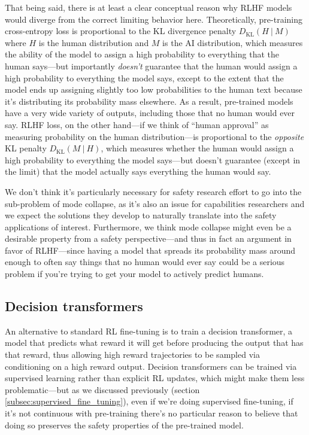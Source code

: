 \documentclass[
  twocolumn,
  natbib,
]{miri-tech-article}
\begin{document}
That being said, there is at least a clear conceptual reason why RLHF models would diverge from the correct limiting behavior here. Theoretically, pre-training cross-entropy loss is proportional to the KL divergence penalty $D_\text{KL}(H ~|~ M)$ where $H$ is the human distribution and $M$ is the AI distribution, which measures the ability of the model to assign a high probability to everything that the human says---but importantly \textit{doesn't} guarantee that the human would assign a high probability to everything the model says, except to the extent that the model ends up assigning slightly too low probabilities to the human text because it's distributing its probability mass elsewhere. As a result, pre-trained models have a very wide variety of outputs, including those that no human would ever say. RLHF loss, on the other hand---if we think of ``human approval'' as measuring probability on the human distribution---is proportional to the \textit{opposite} KL penalty $D_\text{KL}(M ~|~ H)$, which measures whether the human would assign a high probability to everything the model says---but doesn't guarantee (except in the limit) that the model actually says everything the human would say.

We don't think it's particularly necessary for safety research effort to go into the sub-problem of mode collapse, as it's also an issue for capabilities researchers and we expect the solutions they develop to naturally translate into the safety applications of interest. Furthermore, we think mode collapse might even be a desirable property from a safety perspective---and thus in fact an argument in favor of RLHF---since having a model that spreads its probability mass around enough to often say things that no human would ever say could be a serious problem if you're trying to get your model to actively predict humans.


\subsection{Decision transformers}

An alternative to standard RL fine-tuning is to train a decision transformer\cite{chen_decision_2021}, a model that predicts what reward it will get before producing the output that has that reward, thus allowing high reward trajectories to be sampled via conditioning on a high reward output. Decision transformers can be trained via supervised learning rather than explicit RL updates, which might make them less problematic---but as we discussed previously (section \ref{subsec:supervised_fine_tuning}), even if we're doing supervised fine-tuning, if it's not continuous with pre-training there's no particular reason to believe that doing so preserves the safety properties of the pre-trained model.
\end{document}
